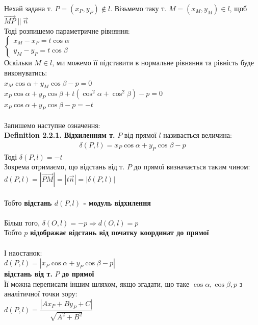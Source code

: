 \documentclass[a4paper, 14pt]{extarticle}
\def\defin#1{\textbf{Definition {#1}}}
\def\bigline{\vspace{5mm}\\}
\begin{document}
Нехай задана т. $P = (x_P, y_P) \not \in l$. Візьмемо таку т. $M = (x_M, y_M) \in l$, щоб $\overrightarrow{MP} \parallel \vec{n}$\\
Тоді розпишемо параметричне рівняння:\\
$\begin{cases}
x_M - x_P = t \cos \alpha\\
y_M - y_P = t \cos \beta
\end{cases}
$\\
Оскільки $M \in l$, ми можемо її підставити в нормальне рівняння та рівність буде виконуватись:\\
$x_M \cos \alpha + y_M \cos \beta - p = 0$\\
$x_P \cos \alpha + y_P \cos \beta + t(\cos^2 \alpha + \cos^2 \beta) - p = 0$\\
$x_P \cos \alpha + y_P \cos \beta -p = -t$\\
\\
Запишемо наступне означення:\\
\defin{2.2.1. Відхиленням т.} $P$ від прямої $l$ називається величина:
\begin{align*}
\delta(P,l) = x_P \cos \alpha + y_P \cos \beta - p
\end{align*}
Тоді $\delta(P,l)=-t$\\
Зокрема отримаємо, що відстань від т. $P$ до прямої визначається таким чином:\\
$d(P,l)=|\overrightarrow{PM}| = |t \vec{n}| = |\delta(P,l)|$\\
\\
Тобто \textbf{відстань $d(P,l)$ - модуль відхилення}\\
\\
Більш того, $\delta(O,l) = -p \Rightarrow d(O,l) = p$\\
Тобто $p$ \textbf{відображає відстань від початку координат до прямої}\\
\\
І наостанок:\\
$d(P,l) = |x_P \cos \alpha + y_P \cos \beta - p|$\\
\textbf{відстань від т.} $P$ \textbf{до прямої}\\
Її можна переписати іншим шляхом, якщо згадати, що таке $\cos \alpha, \cos \beta, p$ з аналітичної точки зору:\\
$d(P,l) = \dfrac{|Ax_P + By_P + C|}{\sqrt{A^2+B^2}}$
\bigline
\end{document}
